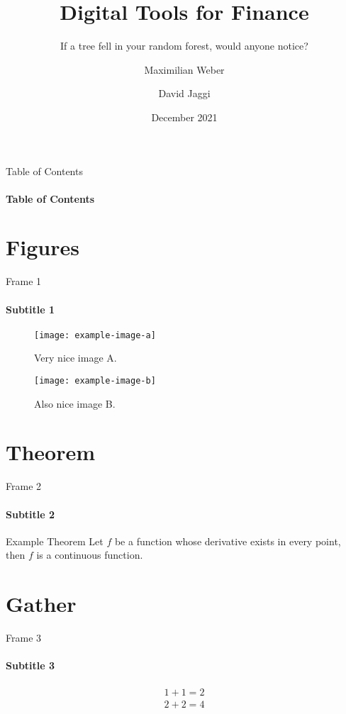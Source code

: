 \documentclass[10pt]{beamer}
\title{Digital Tools for Finance}
\subtitle{If a tree fell in your random forest, would anyone notice?}
\author{Maximilian Weber \and David Jaggi}
\institute{University of Zurich}
\date{December 2021}
\begin{document}
\frame{\titlepage}
\begin{frame}{Table of Contents}
    \framesubtitle{Table of Contents}
    \tableofcontents
\end{frame}
\section{Figures}
\begin{frame}{Frame 1}
    \framesubtitle{Subtitle 1}
    \begin{figure}
    \centering
        \begin{minipage}{.45\textwidth}
          \centering
          \texttt{[image: example-image-a]}
          \caption{Very nice image A.}
          \label{fig:test-a}
        \end{minipage}%
        \begin{minipage}{.45\textwidth}
          \centering
          \texttt{[image: example-image-b]}
          \caption{Also nice image B.}
          \label{fig:test-b}
        \end{minipage}
    \end{figure}
\end{frame}
\section{Theorem}
\begin{frame}{Frame 2}
    \framesubtitle{Subtitle 2}
    \begin{theorem}{Example Theorem}
        Let \(f\) be a function whose derivative exists in every point, then \(f\) 
        is a continuous function.
    \end{theorem}
\end{frame}
\section{Gather}
\begin{frame}{Frame 3}
    \framesubtitle{Subtitle 3}
        \begin{gather}
            1+1=2 \\
            2+2=4
        \end{gather}
\end{frame}
\end{document}
